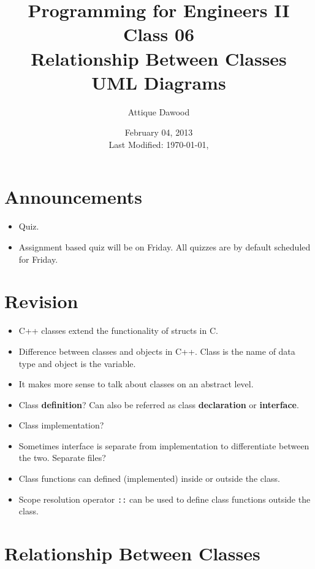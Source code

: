 \documentclass[12pt,a4paper]{article}
\title{\vspace{-2cm}Programming for Engineers II\\Class 06\\Relationship Between Classes\\UML Diagrams}
\author{Attique Dawood}
\date{February 04, 2013\\[0.2cm] Last Modified: \today, \currenttime}
\begin{document}
\maketitle
\section{Announcements}
\begin{itemize}
\item Quiz.
\item Assignment based quiz will be on Friday. All quizzes are by default scheduled for Friday.
\end{itemize}
\section{Revision}
\begin{itemize}
\item C++ classes extend the functionality of structs in C.
\item Difference between classes and objects in C++. Class is the name of data type and object is the variable.
\item It makes more sense to talk about classes on an abstract level.
\item Class \textbf{definition}? Can also be referred as class \textbf{declaration} or \textbf{interface}.
\item Class implementation?
\item Sometimes interface is separate from implementation to differentiate between the two. Separate files?
\item Class functions can defined (implemented) inside or outside the class.
\item Scope resolution operator \verb|::| can be used to define class functions outside the class.
\end{itemize}
\section{Relationship Between Classes}
\end{document}
